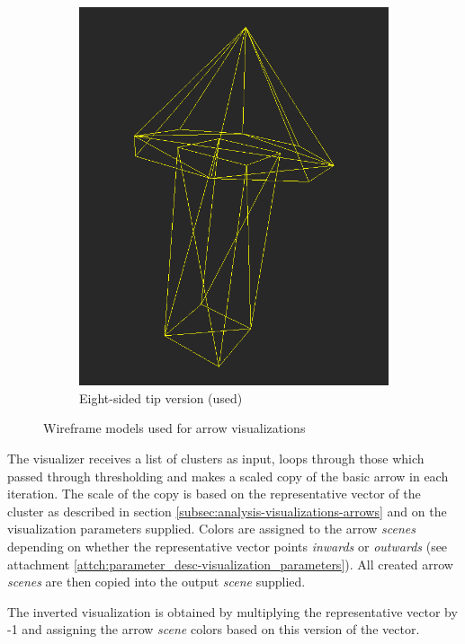 \begin{figure}[h]
\begin{subfigure}{0.3\textwidth}
	\includegraphics[width=\textwidth]{./img/8sided_arrow.PNG}
    \caption{Eight-sided tip version (used)}
    \label{fig:meshdiff-8sided_arrow}
	\end{subfigure}
\caption[Wireframe models used for arrow visualizations]{Wireframe models used for arrow visualizations}
\end{figure}

The visualizer receives a list of clusters as input, loops through those which passed through thresholding and makes a scaled copy of the basic arrow in each iteration. The scale of the copy is based on the representative vector of the cluster as described in section \ref{subsec:analysis-visualizations-arrows} and on the visualization parameters supplied. Colors are assigned to the arrow {\it scenes} depending on whether the representative vector points {\it inwards} or {\it outwards} (see attachment \ref{attch:parameter_desc-visualization_parameters}). All created arrow {\it scenes} are then copied into the output {\it scene} supplied.

The inverted visualization is obtained by multiplying the representative vector by -1 and assigning the arrow {\it scene} colors based on this version of the vector.

